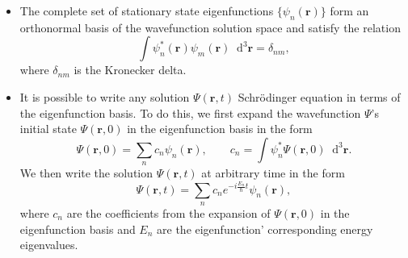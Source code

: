 \documentclass[11pt, a4paper]{article}
\newcommand{\diff}{\mathop{}\!\mathrm{d}} %
\newcommand{\dr}{\diff^{3} \r}  %
\newcommand{\Schro}{Schr\"{o}dinger\xspace}
\renewcommand{\vec}[1]{\bm{#1}}  %
\renewcommand{\r}{\vec{r}}  %
\newcommand{\p}{\psi}  %
\renewcommand{\P}{\Psi}  %
\begin{document}
\begin{itemize}
	\item The complete set of stationary state eigenfunctions $ \{\p_{n}(\r)\} $ form an orthonormal basis of the wavefunction solution space and satisfy the relation
	\begin{equation*}
		\int \p^{*}_{n}(\r)  \p_{m}(\r) \dr = \delta_{nm},
	\end{equation*}
	where $ \delta_{nm} $ is the Kronecker delta. 
	
	\item It is possible to write any solution $ \P(\r, t) $ \Schro equation in terms of the eigenfunction basis. To do this, we first expand the wavefunction $ \P $'s initial state $ \P(\r, 0) $ in the eigenfunction basis in the form
	\begin{equation*}
		\P(\r, 0) = \sum_{n}c_{n} \p_{n}(\r), \qquad c_{n} = \int \p_{n}^{*}\P(\r, 0)\dr.
	\end{equation*}
	We then write the solution $ \P(\r, t) $ at arbitrary time in the form
	\begin{equation*}
		\P(\r, t) = \sum_{n}c_{n}e^{-i\frac{E_{n}}{\hbar}t}\p_{n}(\r),
	\end{equation*}
	where $ c_{n} $ are the coefficients from the expansion of $ \P(\r, 0) $ in the eigenfunction basis and $ E_{n} $ are the eigenfunction' corresponding energy eigenvalues.
\end{itemize}
\end{document}

